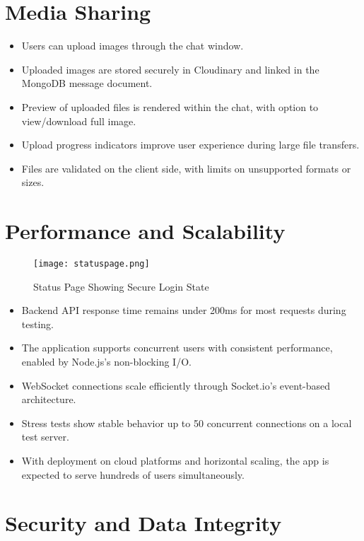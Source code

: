 \documentclass[12pt,a4paper]{report}
\begin{document}
\section{Media Sharing}

\begin{itemize}
    \item Users can upload images through the chat window.
    \item Uploaded images are stored securely in Cloudinary and linked in the MongoDB message document.
    \item Preview of uploaded files is rendered within the chat, with option to view/download full image.
    \item Upload progress indicators improve user experience during large file transfers.
    \item Files are validated on the client side, with limits on unsupported formats or sizes.
\end{itemize}

\section{Performance and Scalability}

\begin{figure}[H]
    \centering
    \texttt{[image: statuspage.png]}
    \caption{Status Page Showing Secure Login State}
\end{figure}


\begin{itemize}
    \item Backend API response time remains under 200ms for most requests during testing.
    \item The application supports concurrent users with consistent performance, enabled by Node.js’s non-blocking I/O.
    \item WebSocket connections scale efficiently through Socket.io’s event-based architecture.
    \item Stress tests show stable behavior up to 50 concurrent connections on a local test server.
    \item With deployment on cloud platforms and horizontal scaling, the app is expected to serve hundreds of users simultaneously.
\end{itemize}

\section{Security and Data Integrity}
\end{document}
